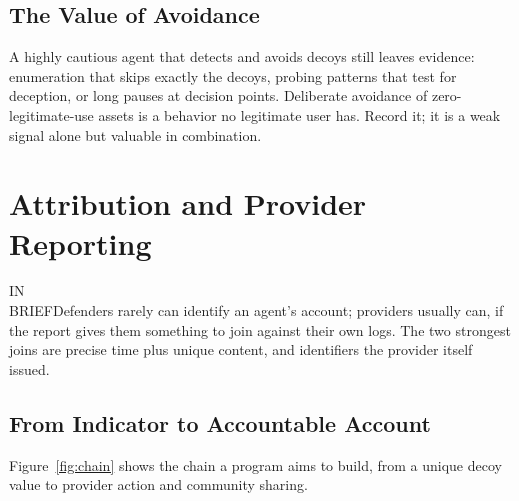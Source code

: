 \documentclass[11pt,letterpaper]{article}
\newcommand{\inbrief}[1]{\begin{inbriefbox}IN\\BRIEF\tcblower #1\end{inbriefbox}}
\begin{document}
\subsection{The Value of Avoidance}
\label{sec:avoidance}

A highly cautious agent that detects and avoids decoys still leaves evidence: enumeration that skips exactly the decoys, probing patterns that test for deception, or long pauses at decision points. Deliberate avoidance of zero-legitimate-use assets is a behavior no legitimate user has. Record it; it is a weak signal alone but valuable in combination.

\section{Attribution and Provider Reporting}
\label{sec:attribution}

\inbrief{Defenders rarely can identify an agent's account; providers usually can, if the report gives them something to join against their own logs. The two strongest joins are precise time plus unique content, and identifiers the provider itself issued.}

\subsection{From Indicator to Accountable Account}
\label{sec:chain}

Figure~\ref{fig:chain} shows the chain a program aims to build, from a unique decoy value to provider action and community sharing.
\end{document}
